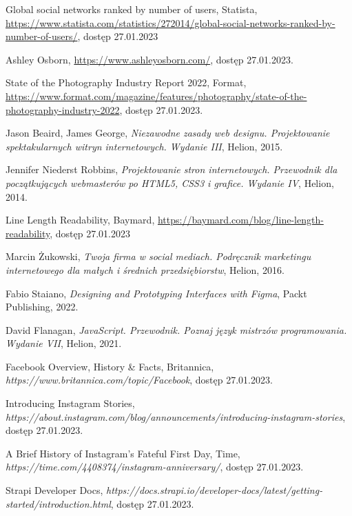 \documentclass[a4paper, 12pt]{article}
\numberwithin{figure}{section}
\begin{document}
\begin{sloppypar}
\begin{thebibliography}{99}
    Global social networks ranked by number of users, Statista,
    \url{https://www.statista.com/statistics/272014/global-social-networks-ranked-by-number-of-users/},
    dostęp 27.01.2023

    Ashley Osborn,
    \url{https://www.ashleyosborn.com/},
    dostęp 27.01.2023.

    State of the Photography Industry Report 2022, Format,
    \url{https://www.format.com/magazine/features/photography/state-of-the-photography-industry-2022},
    dostęp 27.01.2023.

    Jason Beaird, James George,
    \textit{Niezawodne zasady web designu. Projektowanie spektakularnych witryn internetowych. Wydanie III},
    Helion,
    2015.

    Jennifer Niederst Robbins,
    \textit{Projektowanie stron internetowych. Przewodnik dla początkujących webmasterów po HTML5, CSS3 i grafice. Wydanie IV},
    Helion,
    2014.

    Line Length Readability, Baymard,
    \url{https://baymard.com/blog/line-length-readability},
    dostęp 27.01.2023

    Marcin Żukowski,
    \textit{Twoja firma w social mediach. Podręcznik marketingu internetowego dla małych i średnich przedsiębiorstw},
    Helion,
    2016.

    Fabio Staiano,
    \textit{Designing and Prototyping Interfaces with Figma},
    Packt Publishing,
    2022.

    David Flanagan,
    \textit{JavaScript. Przewodnik. Poznaj język mistrzów programowania. Wydanie VII},
    Helion,
    2021.

    Facebook Overview, History \& Facts, Britannica,
    \textit{https://www.britannica.com/topic/Facebook},
    dostęp 27.01.2023.

    Introducing Instagram Stories,
    \textit{https://about.instagram.com/blog/announcements/introducing-instagram-stories},
    dostęp 27.01.2023.

    A Brief History of Instagram's Fateful First Day, Time,
    \textit{https://time.com/4408374/instagram-anniversary/},
    dostęp 27.01.2023.

    Strapi Developer Docs,
    \textit{https://docs.strapi.io/developer-docs/latest/getting-started/introduction.html},
    dostęp 27.01.2023.


\end{thebibliography}
\end{sloppypar}
\end{document}
